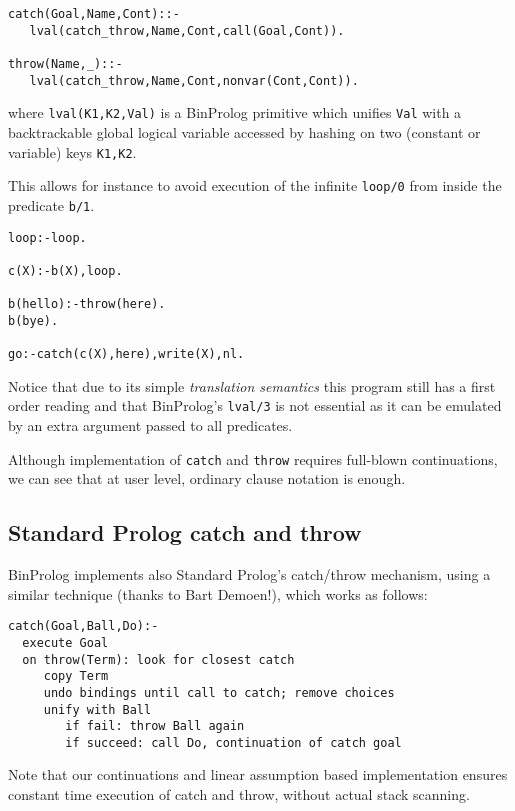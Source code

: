 \documentclass{article}
\begin{document}
{\small
\begin{verbatim}
catch(Goal,Name,Cont)::-
   lval(catch_throw,Name,Cont,call(Goal,Cont)).

throw(Name,_)::-
   lval(catch_throw,Name,Cont,nonvar(Cont,Cont)).
\end{verbatim}
}

{\flushleft where} {\tt lval(K1,K2,Val)} is  a BinProlog
primitive which unifies {\tt Val} with a backtrackable global logical
variable accessed by hashing on two (constant or variable) 
keys {\tt K1,K2}.

This allows for instance to avoid execution of the infinite {\tt loop/0}
from inside the predicate {\tt b/1}.

{\small
\begin{verbatim}
loop:-loop.

c(X):-b(X),loop.

b(hello):-throw(here).
b(bye).

go:-catch(c(X),here),write(X),nl.
\end{verbatim}
}

Notice that due to its simple {\em translation semantics} this program
still has a first order reading and that BinProlog's {\tt lval/3}
is not essential as it can be emulated by an extra argument passed
to all predicates.

Although implementation of {\tt catch} and {\tt throw} requires full-blown
continuations, we can see that at user level, ordinary
clause notation is enough.


\subsection{Standard Prolog catch and throw}

BinProlog  implements also Standard Prolog's catch/throw mechanism,
using a similar technique (thanks to Bart Demoen!), which works as follows:

{\small
\begin{verbatim}
catch(Goal,Ball,Do):-
  execute Goal
  on throw(Term): look for closest catch
     copy Term
     undo bindings until call to catch; remove choices
     unify with Ball
        if fail: throw Ball again
        if succeed: call Do, continuation of catch goal
\end{verbatim}
}

Note that our continuations and linear assumption based implementation
ensures constant time execution of catch and throw, without actual
stack scanning.
\end{document}
